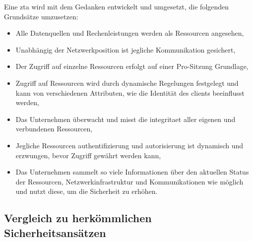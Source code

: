 Eine \gls{zta} wird mit dem Gedanken entwickelt und umgesetzt, die folgenden Grundsätze umzusetzen:
\begin{itemize}
    \item Alle Datenquellen und Rechenleistungen werden als Ressourcen angesehen,
    \item Unabhängig der Netzwerkposition ist jegliche Kommunikation gesichert,
    \item Der Zugriff auf einzelne Ressourcen erfolgt auf einer Pro-Sitzung Grundlage,
    \item Zugriff auf Ressourcen wird durch dynamische Regelungen festgelegt und kann von verschiedenen Attributen, wie die Identität des \glspl{client} beeinflusst werden,
    \item Das Unternehmen überwacht und misst die \gls{integritaet} aller eigenen und verbundenen Ressourcen,
    \item Jegliche Ressourcen \gls{authentifizierung} und \gls{autorisierung} ist dynamisch und erzwungen, bevor Zugriff gewährt werden kann,
    \item Das Unternehmen sammelt so viele Informationen über den aktuellen Status der Ressourcen, Netzwerkinfrastruktur und Kommunikationen wie möglich und nutzt diese, um die Sicherheit zu erhöhen.\autocite[\vglf][-7]{NIST:800207}
\end{itemize}

\subsection{Vergleich zu herkömmlichen Sicherheitsansätzen}\label{subsec:vergleich-zu-herkommlichen-sicherheitsansatzen}
